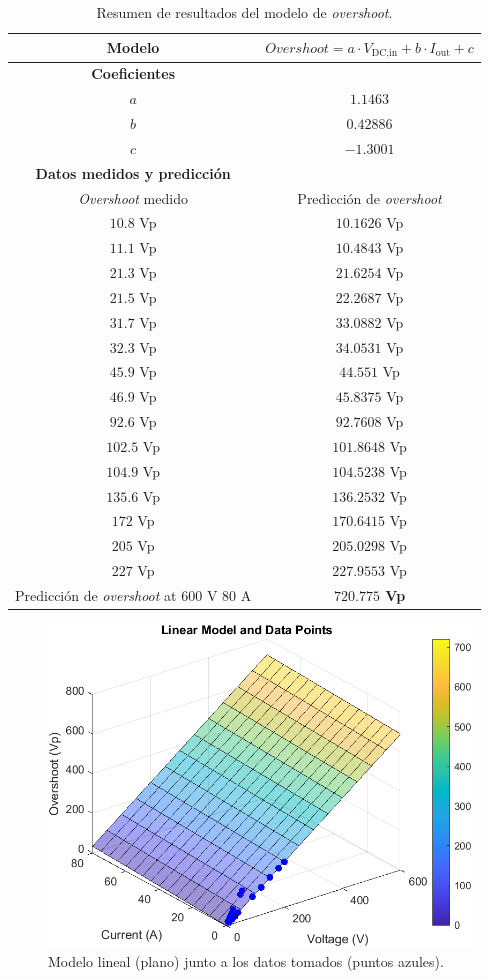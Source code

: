 \begin{table}[H]
	\centering
	\begin{tabular}{|c|c|}
		\hline
		\textbf{Modelo} & $Overshoot = a \cdot V_{\text{DC,in}} + b \cdot I_{\text{out}} + c$ \\
		\hline
		\textbf{Coeficientes} & \\
		\hline
		$a$ & $1.1463$ \\
		$b$ & $0.42886$ \\
		$c$ & $-1.3001$ \\
		\hline
		\textbf{Datos medidos y predicción} & \\
		\hline
		\textit{Overshoot} medido & Predicción de \textit{overshoot} \\
		\hline
		$10.8$ Vp & $10.1626$ Vp \\
		$11.1$ Vp & $10.4843$ Vp \\
		$21.3$ Vp & $21.6254$ Vp \\
		$21.5$ Vp & $22.2687$ Vp \\
		$31.7$ Vp & $33.0882$ Vp \\
		$32.3$ Vp & $34.0531$ Vp \\
		$45.9$ Vp & $44.551$ Vp \\
		$46.9$ Vp & $45.8375$ Vp \\
		$92.6$ Vp & $92.7608$ Vp \\
		$102.5$ Vp & $101.8648$ Vp \\
		$104.9$ Vp & $104.5238$ Vp \\
		$135.6$ Vp & $136.2532$ Vp \\
		$172$ Vp & $170.6415$ Vp \\
		$205$ Vp & $205.0298$ Vp \\
		$227$ Vp & $227.9553$ Vp \\
		\hline
		Predicción de \textit{overshoot} at $600$ V $80$ A & {\color{red}\textbf{$720.775$ Vp}} \\
		\hline
	\end{tabular}
	\caption{Resumen de resultados del modelo de \textit{overshoot}.}
\end{table}


\begin{figure}[H]
	\centering
	\includegraphics[width=0.7\linewidth]{fig/overshootFinal3}
	\caption{Modelo lineal (plano) junto a los datos tomados (puntos azules).}
\end{figure}


